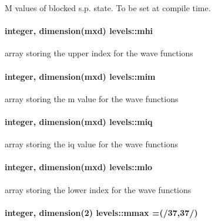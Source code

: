 M values of blocked s.\+p. state. To be set at compile time. 

\paragraph[{\texorpdfstring{mhi}{mhi}}]{\setlength{\rightskip}{0pt plus 5cm}integer, dimension(mxd) levels\+::mhi}\hypertarget{namespacelevels_af4cae1dd585ebc4fefc67e9b52583d4c}{}\label{namespacelevels_af4cae1dd585ebc4fefc67e9b52583d4c}


array storing the upper index for the wave functions 

\paragraph[{\texorpdfstring{mim}{mim}}]{\setlength{\rightskip}{0pt plus 5cm}integer, dimension(mxd) levels\+::mim}\hypertarget{namespacelevels_a810b7d5167ba33e2d1126f6e037aa4de}{}\label{namespacelevels_a810b7d5167ba33e2d1126f6e037aa4de}


array storing the m value for the wave functions 

\paragraph[{\texorpdfstring{miq}{miq}}]{\setlength{\rightskip}{0pt plus 5cm}integer, dimension(mxd) levels\+::miq}\hypertarget{namespacelevels_a6b4800eb9c482f58ae07e726f5ffa192}{}\label{namespacelevels_a6b4800eb9c482f58ae07e726f5ffa192}


array storing the iq value for the wave functions 

\paragraph[{\texorpdfstring{mlo}{mlo}}]{\setlength{\rightskip}{0pt plus 5cm}integer, dimension(mxd) levels\+::mlo}\hypertarget{namespacelevels_ad9e8443a0bdfbd278d0bf92ddc6b450a}{}\label{namespacelevels_ad9e8443a0bdfbd278d0bf92ddc6b450a}


array storing the lower index for the wave functions 

\paragraph[{\texorpdfstring{mmax}{mmax}}]{\setlength{\rightskip}{0pt plus 5cm}integer, dimension(2) levels\+::mmax =(/37,37/)}\hypertarget{namespacelevels_a243a270ec88ba667b841f634868f6399}{}\label{namespacelevels_a243a270ec88ba667b841f634868f6399}


